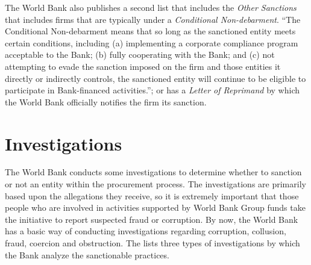 The World Bank also publishes a second list that includes the \textit{Other Sanctions} that includes firms that are typically under a \textit{Conditional Non-debarment}. ``The Conditional Non-debarment means that so long as the sanctioned entity meets certain conditions, including (a) implementing a corporate compliance program acceptable to the Bank; (b) fully cooperating with the Bank; and (c) not attempting to evade the sanction imposed on the firm and those entities it directly or indirectly controls, the sanctioned entity will continue to be eligible to participate in Bank-financed activities.''\parencite{wb_debarment}; or has a \textit{Letter of Reprimand} by which the World Bank officially notifies the firm its sanction.


\section{Investigations}

The World Bank conducts some investigations to determine whether to sanction or not an entity within the procurement process. The investigations are primarily based upon the allegations they receive, so it is extremely important that those people who are involved in activities supported by World Bank Group funds take the initiative to report suspected fraud or corruption. By now, the World Bank has a basic way of conducting investigations regarding corruption, collusion, fraud, coercion and obstruction.  The \cite{wb_investigations} lists three types of investigations by which the Bank analyze the sanctionable practices. 



